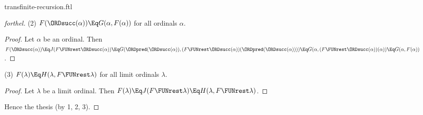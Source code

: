 \documentclass{stex}
\begin{document}
\begin{smodule}{transfinite-recursion.ftl}
\begin{proof}[forthel]
  (2) $F(\ORDsucc(\alpha)) \Eq G(\alpha, F(\alpha))$ for all ordinals $\alpha$.
  \begin{proof}
    Let $\alpha$ be an ordinal.
    Then $F(\ORDsucc(\alpha))
      \Eq J(F \FUNrest \ORDsucc(\alpha))
      \Eq G(\ORDpred(\ORDsucc(\alpha)), (F \FUNrest \ORDsucc(\alpha))(\ORDpred(\ORDsucc(\alpha))))
      \Eq G(\alpha, (F \FUNrest \ORDsucc(\alpha))(\alpha))
      \Eq G(\alpha, F(\alpha))$.
  \end{proof}

  (3) $F(\lambda) \Eq H(\lambda, F \FUNrest \lambda)$ for all limit ordinals $\lambda$.
  \begin{proof}
    Let $\lambda$ be a limit ordinal.
    Then $F(\lambda)
      \Eq J(F \FUNrest \lambda)
      \Eq H(\lambda, F \FUNrest \lambda)$.
  \end{proof}

  Hence the thesis (by 1, 2, 3).
\end{proof}

\printbibliography
{}
\end{smodule}
\end{document}
